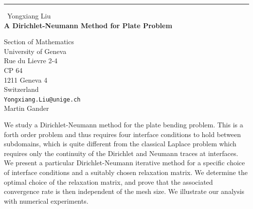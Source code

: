 \documentclass{report}
\begin{document}
\begin{center}
\rule{6in}{1pt} \
{\large Yongxiang Liu \\
{\bf A Dirichlet-Neumann Method for Plate Problem}}

Section of Mathematics \\ University of Geneva \\ Rue du Lievre 2-4 \\ CP 64 \\ 1211 Geneva 4 \\ Switzerland
\\
{\tt Yongxiang.Liu@unige.ch}\\
Martin Gander\end{center}

We study a Dirichlet-Neumann method for the plate bending problem. This
is a forth order problem and thus requires four interface conditions to
hold between subdomains, which is quite different from the classical
Laplace problem which requires only the continuity of the Dirichlet and
Neumann traces at interfaces. We present a particular Dirichlet-Neumann
iterative method for a specific choice
of interface conditions and a suitably chosen relaxation matrix. We
determine the optimal choice of the relaxation matrix, and prove that the
associated convergence rate is then independent of the mesh size. We
illustrate our analysis with numerical experiments.
\end{document}
